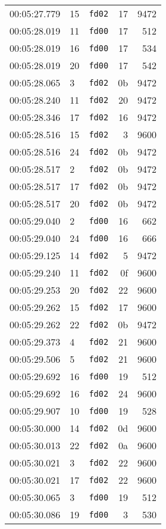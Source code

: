 \documentclass{article}
\begin{document}
\begin{longtable}{lllrr}
00:05:27.779 & 15 & \texttt{fd02} & 17 & 9472 \\
00:05:28.019 & 11 & \texttt{fd00} & 17 & 512 \\
00:05:28.019 & 16 & \texttt{fd00} & 17 & 534 \\
00:05:28.019 & 20 & \texttt{fd00} & 17 & 542 \\
00:05:28.065 & 3 & \texttt{fd02} & 0b & 9472 \\
00:05:28.240 & 11 & \texttt{fd02} & 20 & 9472 \\
00:05:28.346 & 17 & \texttt{fd02} & 16 & 9472 \\
00:05:28.516 & 15 & \texttt{fd02} & 3 & 9600 \\
00:05:28.516 & 24 & \texttt{fd02} & 0b & 9472 \\
00:05:28.517 & 2 & \texttt{fd02} & 0b & 9472 \\
00:05:28.517 & 17 & \texttt{fd02} & 0b & 9472 \\
00:05:28.517 & 20 & \texttt{fd02} & 0b & 9472 \\
00:05:29.040 & 2 & \texttt{fd00} & 16 & 662 \\
00:05:29.040 & 24 & \texttt{fd00} & 16 & 666 \\
00:05:29.125 & 14 & \texttt{fd02} & 5 & 9472 \\
00:05:29.240 & 11 & \texttt{fd02} & 0f & 9600 \\
00:05:29.253 & 20 & \texttt{fd02} & 22 & 9600 \\
00:05:29.262 & 15 & \texttt{fd02} & 17 & 9600 \\
00:05:29.262 & 22 & \texttt{fd02} & 0b & 9472 \\
00:05:29.373 & 4 & \texttt{fd02} & 21 & 9600 \\
00:05:29.506 & 5 & \texttt{fd02} & 21 & 9600 \\
00:05:29.692 & 16 & \texttt{fd00} & 19 & 512 \\
00:05:29.692 & 16 & \texttt{fd02} & 24 & 9600 \\
00:05:29.907 & 10 & \texttt{fd00} & 19 & 528 \\
00:05:30.000 & 14 & \texttt{fd02} & 0d & 9600 \\
00:05:30.013 & 22 & \texttt{fd02} & 0a & 9600 \\
00:05:30.021 & 3 & \texttt{fd02} & 22 & 9600 \\
00:05:30.021 & 17 & \texttt{fd02} & 22 & 9600 \\
00:05:30.065 & 3 & \texttt{fd00} & 19 & 512 \\
00:05:30.086 & 19 & \texttt{fd00} & 3 & 530 \\

\end{longtable}
\end{document}
